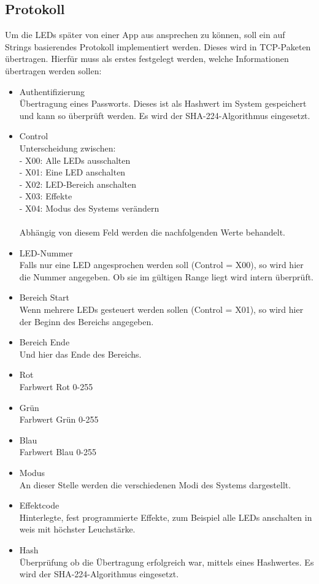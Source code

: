 
\subsection{Protokoll}
Um die LEDs später von einer App aus ansprechen zu können, soll ein auf Strings basierendes Protokoll implementiert werden. Dieses wird in TCP-Paketen übertragen. Hierfür muss als erstes festgelegt werden, welche Informationen übertragen werden sollen: \\
\begin{itemize}
\item Authentifizierung\\
Übertragung eines Passworts. Dieses ist als Hashwert im System gespeichert und kann so überprüft werden. Es wird der SHA-224-Algorithmus eingesetzt.
\item Control\\
Unterscheidung zwischen:\\
	- X00: Alle LEDs ausschalten\\
	- X01: Eine LED anschalten\\
	- X02: LED-Bereich anschalten\\
	- X03: Effekte\\
	- X04: Modus des Systems verändern\\\\
Abhängig von diesem Feld werden die nachfolgenden Werte behandelt. 
\item LED-Nummer\\
Falls nur eine LED angesprochen werden soll (Control = X00), so wird hier die Nummer angegeben. Ob sie im gültigen Range liegt wird intern überprüft.
\item Bereich Start\\
Wenn mehrere LEDs gesteuert werden sollen (Control = X01), so wird hier der Beginn des Bereichs angegeben.
\item Bereich Ende\\
Und hier das Ende des Bereichs. 
\item Rot\\
Farbwert Rot 0-255
\item Grün\\
Farbwert Grün 0-255
\item Blau\\
Farbwert Blau 0-255
\item Modus\\
An dieser Stelle werden die verschiedenen Modi des Systems dargestellt.
\item Effektcode\\
Hinterlegte, fest programmierte Effekte, zum Beispiel alle LEDs anschalten in weis mit höchster Leuchstärke.
\item Hash\\
Überprüfung ob die Übertragung erfolgreich war, mittels eines Hashwertes. Es wird der SHA-224-Algorithmus eingesetzt.
\end{itemize}
